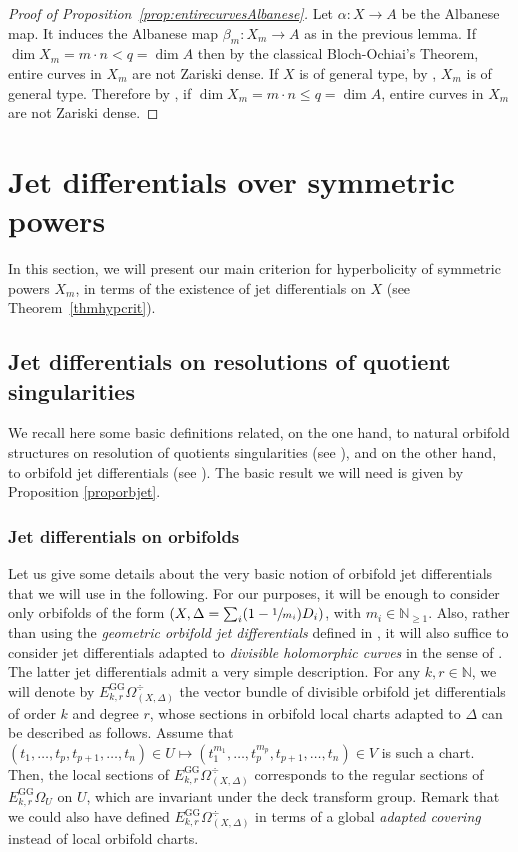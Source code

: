 \documentclass[JEP,XML,SOM,Unicode, NoEqCountersInSection,NoFloatCountersInSection,published]{cedram}
\newcommand{\rGG}{\mathrm{GG}}
\theoremstyle{theorem}
\theoremstyle{definition}
\begin{document}
\begin{proof}[Proof of Proposition~\ref{prop:entirecurvesAlbanese}]
Let $\alpha: X \to A$ be the Albanese map. It induces the Albanese map \(\beta_{m} : X_{m} \to A\) as in the previous lemma. If $\dim X_m=m \cdot n < q=\dim A$ then by the classical Bloch-Ochiai's Theorem, entire curves in $X_m$ are not Zariski dense.
If $X$ is of general type, by \cite{AA02}, $X_m$ is of general type. Therefore by \cite[Cor.\,3.1.14]{Yam04}, if $\dim X_m=m \cdot n \leq q=\dim A$, entire curves in $X_m$ are not Zariski dense.
\end{proof}

\section{Jet differentials over symmetric powers}\label{sec:hyp}

In this section, we will present our main criterion for hyperbolicity of symmetric powers \(X_{m}\), in terms of the existence of jet differentials on \(X\) (see Theorem~\ref{thmhypcrit}).

\subsection{Jet differentials on resolutions of quotient singularities} \label{sectjetdifforb}

We recall here some basic definitions related, on the one hand, to natural orbifold structures on resolution of quotients singularities (see \cite{CRT17, cad18, CDG19}), and on the other hand, to orbifold jet differentials (see \cite{CDR18}). The basic result we will need is given by Proposition \ref{proporbjet}.

\subsubsection{Jet differentials on orbifolds} Let us give some details about the very basic notion of orbifold jet differentials that we will use in the following. For our purposes, it will be enough to consider only orbifolds of the form $(X, \Delta = \sum_{i} (1 - \sfrac{1}{m_i}) D_i)$, with $m_i \in \mathbb N_{\geq 1}$. Also, rather than using the \emph{geometric orbifold jet differentials} defined in \cite{CDR18}, it will also suffice to consider jet differentials adapted to \emph{divisible holomorphic curves} in the sense of \cite[Def.\,1.1]{CDR18}. The latter jet differentials admit a very simple description. For any $k, r \in \mathbb N$, we will denote by $E_{k, r}^{\rGG} \Omega_{(X, \Delta)}^\div$ the vector bundle of divisible orbifold jet differentials of order $k$ and degree $r$, whose sections in orbifold local charts adapted to $\Delta$ can be described as follows. Assume that $(t_1,\dots, t_{p}, t_{p+1},\dots, t_n) \in U \longmapsto (t_1^{m_1},\dots, t_p^{m_p}, t_{p+1},\dots, t_n) \in V$ is such a chart. Then, the local sections of $E_{k, r}^{\rGG} \Omega_{(X, \Delta)}^\div$ corresponds to the regular sections of $E_{k, r}^{\rGG} \Omega_U$ on $U$, which are invariant under the deck transform group. Remark that we could also have defined $E_{k, r}^{\rGG} \Omega_{(X, \Delta)}^\div$ in terms of a global \emph{adapted covering} instead of local orbifold charts.
\end{document}
